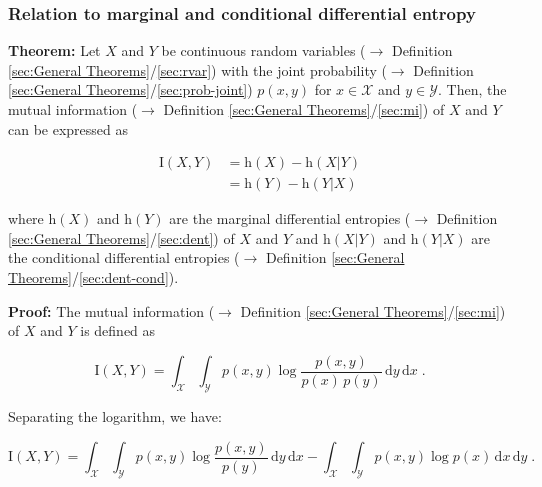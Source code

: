 \documentclass[a4paper,12pt,twoside]{book}
\begin{document}
\subsubsection[\textbf{Relation to marginal and conditional differential entropy}]{Relation to marginal and conditional differential entropy} \label{sec:cmi-mcde}
\setcounter{equation}{0}

\textbf{Theorem:} Let $X$ and $Y$ be continuous random variables ($\rightarrow$ Definition \ref{sec:General Theorems}/\ref{sec:rvar}) with the joint probability ($\rightarrow$ Definition \ref{sec:General Theorems}/\ref{sec:prob-joint}) $p(x,y)$ for $x \in \mathcal{X}$ and $y \in \mathcal{Y}$. Then, the mutual information ($\rightarrow$ Definition \ref{sec:General Theorems}/\ref{sec:mi}) of $X$ and $Y$ can be expressed as

\begin{equation} \label{eq:cmi-mcde-cmi-mcde}
\begin{split}
\mathrm{I}(X,Y) &= \mathrm{h}(X) - \mathrm{h}(X|Y) \\
&= \mathrm{h}(Y) - \mathrm{h}(Y|X)
\end{split}
\end{equation}

where $\mathrm{h}(X)$ and $\mathrm{h}(Y)$ are the marginal differential entropies ($\rightarrow$ Definition \ref{sec:General Theorems}/\ref{sec:dent}) of $X$ and $Y$ and $\mathrm{h}(X \vert Y)$ and $\mathrm{h}(Y \vert X)$ are the conditional differential entropies ($\rightarrow$ Definition \ref{sec:General Theorems}/\ref{sec:dent-cond}).


\vspace{1em}
\textbf{Proof:} The mutual information ($\rightarrow$ Definition \ref{sec:General Theorems}/\ref{sec:mi}) of $X$ and $Y$ is defined as

\begin{equation} \label{eq:cmi-mcde-MI}
\mathrm{I}(X,Y) = \int_{\mathcal{X}} \int_{\mathcal{Y}} p(x,y) \log \frac{p(x,y)}{p(x)\,p(y)} \, \mathrm{d}y \, \mathrm{d}x \; .
\end{equation}

Separating the logarithm, we have:

\begin{equation} \label{eq:cmi-mcde-MI-s1}
\mathrm{I}(X,Y) = \int_{\mathcal{X}} \int_{\mathcal{Y}} p(x,y) \log \frac{p(x,y)}{p(y)} \, \mathrm{d}y \, \mathrm{d}x - \int_{\mathcal{X}} \int_{\mathcal{Y}} p(x,y) \log p(x) \, \mathrm{d}x \, \mathrm{d}y \; .
\end{equation}
\end{document}
